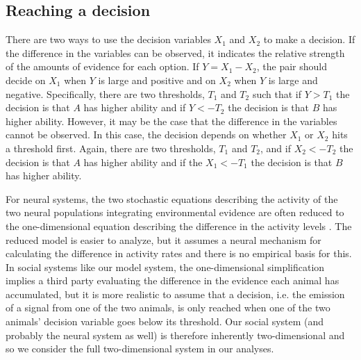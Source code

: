 \documentclass{pnastwo}
\begin{document}
\begin{article}
\subsection{Reaching a decision}
There are two ways to use the decision variables $X_1$ and $X_2$ to make a decision.  If the difference in the variables can be observed, it indicates the relative strength of the amounts of evidence for each option. If $Y=X_1-X_2$, the pair should decide on $X_1$ when $Y$ is large and positive and on $X_2$ when $Y$ is large and negative.  Specifically, there are two thresholds, $T_1$ and $T_2$ such that if $Y>T_1$ the decision is that $A$ has higher ability and if $Y<-T_2$ the decision is that $B$ has higher ability.  However, it may be the case that the difference in the variables cannot be observed.  In this case, the decision depends on whether $X_1$ or $X_2$ hits a threshold first.  Again, there are two thresholds, $T_1$ and $T_2$, and if $X_2<-T_2$ the decision is that $A$ has higher ability and if the $X_1<-T_1$ the decision is that $B$ has higher ability.  

For neural systems, the two stochastic equations describing the activity of the two neural populations integrating environmental evidence are often reduced to the one-dimensional equation describing the difference in the activity levels \cite{Brown:2005fk,Bogacz:2006uq,Feng:2009kl}. The reduced model is easier to analyze, but it assumes a neural mechanism for calculating the difference in activity rates and there is no empirical basis for this. In social systems like our model system, the one-dimensional simplification implies a third party evaluating the difference in the evidence each animal has accumulated, but it is more realistic to assume that a decision, i.e. the emission of a signal from one of the two animals, is only reached when one of the two animals' decision variable goes below its threshold. Our social system (and probably the neural system as well) is therefore inherently two-dimensional and so we consider the full two-dimensional system in our analyses.  


\end{article}
\end{document}
